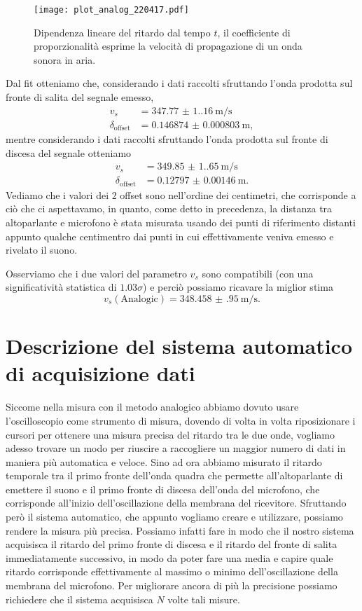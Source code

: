 \documentclass[
    rmp,
    reprint, 
    superscriptaddress, 
    altaffilletter, 
    amsmath, 
    amssymb, 
    a4paper,
    varvw]{revtex4-2}
\begin{document}
\begin{figure}[!t]
    \centering
    \texttt{[image: plot\_analog\_220417.pdf]}
    \caption{Dipendenza lineare del ritardo dal tempo $t$, il coefficiente di proporzionalità esprime la velocità di propagazione di un onda sonora in aria.}\label{fig:analog_plot_d1}
\end{figure}

Dal fit otteniamo che, considerando i dati raccolti sfruttando l'onda prodotta sul fronte di salita del segnale emesso, \begin{align*}
    v_s &=\SI{347.77(1.16)}{\metre\per\second}\\
    \delta_\text{offset} &=\SI{0.146874(803)}{\metre},
\end{align*} mentre considerando i dati raccolti sfruttando l'onda prodotta sul fronte di discesa del segnale otteniamo \begin{align*}
    v_s &=\SI{349.85(1.65)}{\metre\per\second}\\
    \delta_\text{offset} &=\SI{0.12797(146)}{\metre}.
\end{align*}
Vediamo che i valori dei 2 offset sono nell'ordine dei centimetri, che corrisponde a ciò che ci aspettavamo, in quanto, come detto in precedenza, la distanza tra altoparlante e microfono è stata misurata usando dei punti di riferimento distanti appunto qualche centimentro dai punti in cui effettivamente veniva emesso e rivelato il suono. 

Osserviamo che i due valori del parametro $v_s$ sono compatibili (con una significatività statistica di $1.03\sigma$) e perciò possiamo ricavare la miglior stima \[v_s(\text{Analogic})=\SI{348.458(950)}{\metre\per\second}.\]

\section{Descrizione del sistema automatico di acquisizione dati}
Siccome nella misura con il metodo analogico abbiamo dovuto usare l'oscilloscopio come strumento di misura, dovendo di volta in volta riposizionare i cursori per ottenere una misura precisa del ritardo tra le due onde, vogliamo adesso trovare un modo per riuscire a raccogliere un maggior numero di dati in maniera più automatica e veloce.
Sino ad ora abbiamo misurato il ritardo temporale tra il primo fronte dell'onda quadra che permette all'altoparlante di emettere il suono e il primo fronte di discesa dell'onda del microfono, che corrisponde all'inizio dell'oscillazione della membrana del ricevitore. Sfruttando però il sistema automatico, che appunto vogliamo creare e utilizzare, possiamo rendere la misura più precisa. Possiamo infatti fare in modo che il nostro sistema acquisisca il ritardo del primo fronte di discesa e il ritardo del fronte di salita immediatamente successivo, in modo da poter fare una media e capire quale ritardo corrisponde effettivamente al massimo o minimo dell'oscillazione della membrana del microfono. Per migliorare ancora di più la precisione possiamo richiedere che il sistema acquisisca $N$ volte tali misure.
\end{document}

